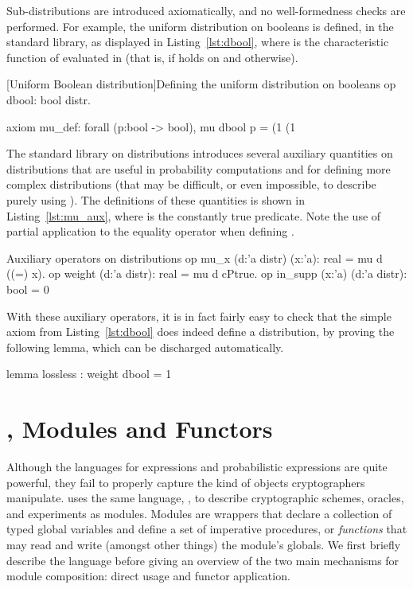 Sub-distributions are introduced axiomatically, and no well-formedness checks
are performed. For example, the uniform distribution on booleans is defined, in
the standard library, as displayed in Listing~\ref{lst:dbool}, where
 is the characteristic function of  evaluated in
 (that is,  if  holds on  and
 otherwise).

\begin{easycrypt}[label={lst:dbool}]{[Uniform Boolean distribution]Defining the uniform distribution on booleans}
op dbool: bool distr.

axiom mu_def: forall (p:bool -> bool), 
  mu dbool p =
    (1%
    (1%
\end{easycrypt}

The standard library on distributions
introduces several auxiliary quantities on distributions that are useful in
probability computations and for defining more complex distributions (that may
be difficult, or even impossible, to describe purely using ). The
definitions of these quantities is shown in Listing~\ref{lst:mu_aux}, where
 is the constantly true predicate. Note the use of partial
application to the equality operator when defining .

\begin{easycrypt}[label={lst:mu_aux}]{Auxiliary operators on distributions}
op mu_x (d:'a distr) (x:'a): real = mu d ((=) x).
op weight (d:'a distr): real = mu d cPtrue.
op in_supp (x:'a) (d:'a distr): bool = 0%
\end{easycrypt}

With these auxiliary operators, it is in fact fairly easy to check that the
simple axiom from Listing~\ref{lst:dbool} does indeed define a distribution, by
proving the following lemma, which can be discharged automatically.

\begin{easycrypt}[]{}
lemma lossless : weight dbool = 1%
\end{easycrypt}

\section{\pWHILE, Modules and Functors\label{sec:modules}}
Although the languages for expressions and probabilistic expressions are quite
powerful, they fail to properly capture the kind of objects cryptographers
manipulate. \EasyCrypt uses the same language, \pWHILE, to describe
cryptographic schemes, oracles, and experiments as modules. Modules are
wrappers that declare a collection of typed global variables and define a set
of imperative procedures, or \emph{functions} %
that may read and write (amongst other things) the module's globals. We first
briefly describe the \pWHILE language before giving an overview of the two main
mechanisms for module composition: direct usage and functor application.

